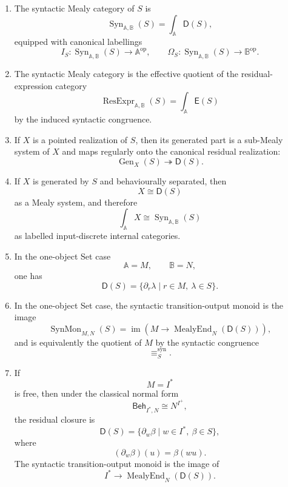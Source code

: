 \begin{theorem}
\begin{enumerate}
\item The syntactic Mealy category of \(S\) is
\[
\operatorname{Syn}_{\mathbb A,\mathbb B}(S)
=
\int_{\mathbb A}\mathsf D(S),
\]
equipped with canonical labellings
\[
I_S:
\operatorname{Syn}_{\mathbb A,\mathbb B}(S)\to\mathbb A^{\mathrm{op}},
\qquad
\Omega_S:
\operatorname{Syn}_{\mathbb A,\mathbb B}(S)\to\mathbb B^{\mathrm{op}}.
\]

\item The syntactic Mealy category is the effective quotient of the
residual-expression category
\[
\operatorname{ResExpr}_{\mathbb A,\mathbb B}(S)
=
\int_{\mathbb A}\mathsf E(S)
\]
by the induced syntactic congruence.

\item If \(X\) is a pointed realization of \(S\), then its generated part is a
sub-Mealy system of \(X\) and maps regularly onto the canonical residual
realization:
\[
\operatorname{Gen}_X(S)
\twoheadrightarrow
\mathsf D(S).
\]

\item If \(X\) is generated by \(S\) and behaviourally separated, then
\[
X\cong \mathsf D(S)
\]
as a Mealy system, and therefore
\[
\int_{\mathbb A}X
\cong
\operatorname{Syn}_{\mathbb A,\mathbb B}(S)
\]
as labelled input-discrete internal categories.

\item In the one-object Set case
\[
\mathbb A=M,
\qquad
\mathbb B=N,
\]
one has
\[
\mathsf D(S)
=
\{\partial_r\lambda\mid r\in M,\ \lambda\in S\}.
\]

\item In the one-object Set case, the syntactic transition-output monoid is
the image
\[
\operatorname{SynMon}_{M,N}(S)
=
\operatorname{im}
\left(
M
\to
\operatorname{MealyEnd}_N(\mathsf D(S))
\right),
\]
and is equivalently the quotient of \(M\) by the syntactic congruence
\[
{\equiv_S^{\operatorname{syn}}}.
\]

\item If
\[
M=I^\ast
\]
is free, then under the classical normal form
\[
\mathsf{Beh}_{I^\ast,N}\cong N^{I^+},
\]
the residual closure is
\[
\mathsf D(S)
=
\{\partial_w\beta\mid w\in I^\ast,\ \beta\in S\},
\]
where
\[
(\partial_w\beta)(u)=\beta(wu).
\]
The syntactic transition-output monoid is the image of
\[
I^\ast
\to
\operatorname{MealyEnd}_N(\mathsf D(S)).
\]
\end{enumerate}
\end{theorem}

